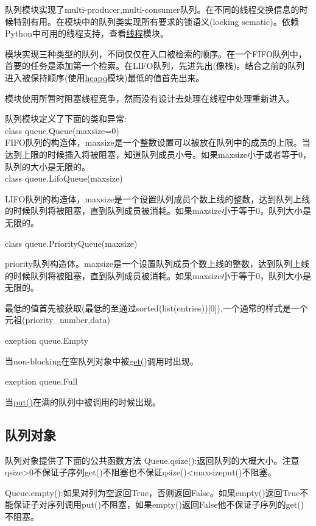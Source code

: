 队列模块实现了multi-producer,multi-consumer队列。在不同的线程交换信息的时候特别有用。在模块中的队列类实现所有要求的锁语义(locking sematic)。依赖Python中可用的线程支持，查看\href{https://docs.python.org/2/library/threading.html#module-threading}{线程}模块。

模块实现三种类型的队列，不同仅仅在入口被检索的顺序。在一个FIFO队列中，首要的任务是添加第一个检索。在LIFO队列，先进先出(像栈)。结合之前的队列进入被保持顺序(使用\href{https://docs.python.org/2/library/heapq.html#module-heapq}{heapq}模块)最低的值首先出来。

模块使用所暂时阻塞线程竞争，然而没有设计去处理在线程中处理重新进入。

队列模块定义了下面的类和异常:\\
class queue.Queue(maxsize=0)\\
FIFO队列的构造体，maxsize是一个整数设置可以被放在队列中的成员的上限。当达到上限的时候插入将被阻塞，知道队列成员小号。如果maxsize小于或者等于0，队列的大小是无限的。\\
class queue.LifoQueue(maxsize)

LIFO队列的构造体，maxsize是一个设置队列成员个数上线的整数，达到队列上线的时候队列将被阻塞，直到队列成员被消耗。如果maxsize小于等于0，队列大小是无限的。

class queue.PriorityQueue(maxsize)

priority队列构造体。maxsize是一个设置队列成员个数上线的整数，达到队列上线的时候队列将被阻塞，直到队列成员被消耗。如果maxsize小于等于0，队列大小是无限的。

最低的值首先被获取(最低的至通过sorted(list(entries))[0]),一个通常的样式是一个元祖(priority\_number,data)

exeption queue.Empty

当non-blocking在空队列对象中被\href{https://docs.python.org/2/library/queue.html#Queue.Queue.get}{get()}调用时出现。

exeption queue.Full

当\href{https://docs.python.org/3.6/library/queue.html#queue.Queue.put}{put()}在满的队列中被调用的时候出现。

\subsection{队列对象}
队列对象提供了下面的公共函数方法
Queue.qsize():返回队列的大概大小。注意qsize>0不保证子序列get()不阻塞也不保证qsize()<maxsizeput()不阻塞。

Queue.empty():如果对列为空返回True，否则返回False。如果empty()返回True不能保证子对序列调用put()不阻塞，如果empty()返回False他不保证子序列的get()不阻塞。

